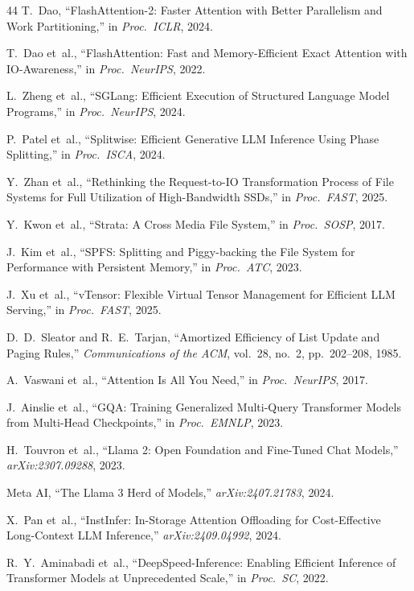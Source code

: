 \documentclass[conference]{IEEEtran}
\begin{document}
\begin{thebibliography}{44}
 T.~Dao, ``FlashAttention-2: Faster Attention with Better Parallelism and Work Partitioning,'' in \textit{Proc.\ ICLR}, 2024.

 T.~Dao et~al., ``FlashAttention: Fast and Memory-Efficient Exact Attention with IO-Awareness,'' in \textit{Proc.\ NeurIPS}, 2022.

 L.~Zheng et~al., ``SGLang: Efficient Execution of Structured Language Model Programs,'' in \textit{Proc.\ NeurIPS}, 2024.

 P.~Patel et~al., ``Splitwise: Efficient Generative LLM Inference Using Phase Splitting,'' in \textit{Proc.\ ISCA}, 2024.

 Y.~Zhan et~al., ``Rethinking the Request-to-IO Transformation Process of File Systems for Full Utilization of High-Bandwidth SSDs,'' in \textit{Proc.\ FAST}, 2025.

 Y.~Kwon et~al., ``Strata: A Cross Media File System,'' in \textit{Proc.\ SOSP}, 2017.

 J.~Kim et~al., ``SPFS: Splitting and Piggy-backing the File System for Performance with Persistent Memory,'' in \textit{Proc.\ ATC}, 2023.

 J.~Xu et~al., ``vTensor: Flexible Virtual Tensor Management for Efficient LLM Serving,'' in \textit{Proc.\ FAST}, 2025.

 D.~D.~Sleator and R.~E.~Tarjan, ``Amortized Efficiency of List Update and Paging Rules,'' \textit{Communications of the ACM}, vol.~28, no.~2, pp.~202--208, 1985.

 A.~Vaswani et~al., ``Attention Is All You Need,'' in \textit{Proc.\ NeurIPS}, 2017.

 J.~Ainslie et~al., ``GQA: Training Generalized Multi-Query Transformer Models from Multi-Head Checkpoints,'' in \textit{Proc.\ EMNLP}, 2023.

 H.~Touvron et~al., ``Llama 2: Open Foundation and Fine-Tuned Chat Models,'' \textit{arXiv:2307.09288}, 2023.

 Meta AI, ``The Llama 3 Herd of Models,'' \textit{arXiv:2407.21783}, 2024.

 X.~Pan et~al., ``InstInfer: In-Storage Attention Offloading for Cost-Effective Long-Context LLM Inference,'' \textit{arXiv:2409.04992}, 2024.

 R.~Y.~Aminabadi et~al., ``DeepSpeed-Inference: Enabling Efficient Inference of Transformer Models at Unprecedented Scale,'' in \textit{Proc.\ SC}, 2022.


\end{thebibliography}
\end{document}
